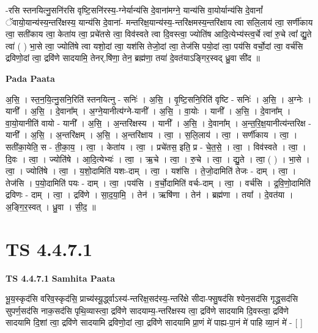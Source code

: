 \documentclass[17pt]{extarticle}
\begin{document}
-रसि स्तनयित्नु॒सनि॑रसि वृष्टि॒सनि॑रस्य॒-ग्नेर्यान्य॑सि दे॒वाना॑मग्ने॒ यान्य॑सि वा॒योर्यान्य॑सि दे॒वानां᳚ ॅवायो॒यान्य॑स्य॒न्तरि॑क्षस्य॒ यान्य॑सि दे॒वाना॑- मन्तरिक्ष॒यान्य॑स्य॒-न्तरि॑क्षमस्य॒न्तरि॑क्षाय त्वा सलि॒लाय॑ त्वा॒ सर्णी॑काय त्वा॒ सती॑काय त्वा॒ केता॑य त्वा॒ प्रचे॑तसे त्वा॒ विव॑स्वते त्वा दि॒वस्त्वा॒ ज्योति॑ष आदि॒त्येभ्य॑स्त्व॒र्चे त्वा॑ रु॒चे त्वा᳚ द्यु॒ते त्वा॑ ( ) भा॒से त्वा॒ ज्योति॑षे त्वा यशो॒दां त्वा॒ यश॑सि तेजो॒दां त्वा॒ तेज॑सि पयो॒दां त्वा॒ पय॑सि वर्चो॒दां त्वा॒ वर्च॑सि द्रविणो॒दां त्वा॒ द्रवि॑णे सादयामि॒ तेनर्.षि॑णा॒ तेन॒ ब्रह्म॑णा॒ तया॑ दे॒वत॑याऽङ्गिर॒स्वद् ध्रु॒वा सी॑द ॥ \newline

\textbf{Pada Paata} \newline

अ॒सि॒ । स्त॒न॒यि॒त्नु॒सनि॒रिति॑ स्तनयित्नु - सनिः॑ । अ॒सि॒ । वृ॒ष्टि॒सनि॒रिति॑ वृष्टि - सनिः॑ । अ॒सि॒ । अ॒ग्नेः । यानी᳚ । अ॒सि॒ । दे॒वाना᳚म् । अ॒ग्ने॒यानीत्य॑ग्ने-यानी᳚ । अ॒सि॒ । वा॒योः । यानी᳚ । अ॒सि॒ । दे॒वाना᳚म् । वा॒यो॒यानीति॑ वायो - यानी᳚ । अ॒सि॒ । अ॒न्तरि॑क्षस्य । यानी᳚ । अ॒सि॒ । दे॒वाना᳚म् । अ॒न्त॒रि॒क्ष॒यानीत्य॑न्तरिक्ष - यानी᳚ । अ॒सि॒ । अ॒न्तरि॑क्षम् । अ॒सि॒ । अ॒न्तरि॑क्षाय । त्वा॒ । स॒लि॒लाय॑ । त्वा॒ । सर्णी॑काय । त्वा॒ । सती॑का॒येति॒ स - ती॒का॒य॒ । त्वा॒ । केता॑य । त्वा॒ । प्रचे॑तस॒ इति॒ प्र - चे॒त॒से॒ । त्वा॒ । विव॑स्वते । त्वा॒ । दि॒वः । त्वा॒ । ज्योति॑षे । आ॒दि॒त्येभ्यः॑ । त्वा॒ । ऋ॒चे । त्वा॒ । रु॒चे । त्वा॒ । द्यु॒ते । त्वा॒ ( ) । भा॒से । त्वा॒ । ज्योति॑षे । त्वा॒ । य॒शो॒दामिति॑ यशः-दाम् । त्वा॒ । यश॑सि । ते॒जो॒दामिति॑ तेजः - दाम् । त्वा॒ । तेज॑सि । प॒यो॒दामिति॑ पयः - दाम् । त्वा॒ ।पय॑सि । व॒र्चो॒दामिति॑ वर्चः-दाम् । त्वा॒ । वर्च॑सि । द्र॒वि॒णो॒दामिति॑ द्रविणः - दाम् । त्वा॒ । द्रवि॑णे । सा॒द॒या॒मि॒ । तेन॑ । ऋषि॑णा । तेन॑ । ब्रह्म॑णा । तया᳚ । दे॒वत॑या । अ॒ङ्गि॒र॒स्वत् । ध्रु॒वा । सी॒द॒ ॥  \newline




\section*{ TS 4.4.7.1 }

\textbf{TS 4.4.7.1 } \newline
\textbf{Samhita Paata} \newline

भू॒य॒स्कृद॑सि वरिव॒स्कृद॑सि॒ प्राच्य॑स्यू॒र्द्ध्वाऽस्य॑-न्तरिक्ष॒सद॑स्य॒-न्तरि॑क्षे सीदा-फ्सु॒षद॑सि श्येन॒सद॑सि गृद्ध्र॒सद॑सि सुपर्ण॒सद॑सि नाक॒सद॑सि पृथि॒व्यास्त्वा॒ द्रवि॑णे सादयाम्य॒-न्तरि॑क्षस्य त्वा॒ द्रवि॑णे सादयामि दि॒वस्त्वा॒ द्रवि॑णे सादयामि दि॒शां त्वा॒ द्रवि॑णे सादयामि द्रविणो॒दां त्वा॒ द्रवि॑णे सादयामि प्रा॒णं मे॑ पाह्य-पा॒नं मे॑ पाहि व्या॒नं मे॑ - [  ] \newline
\end{document}
